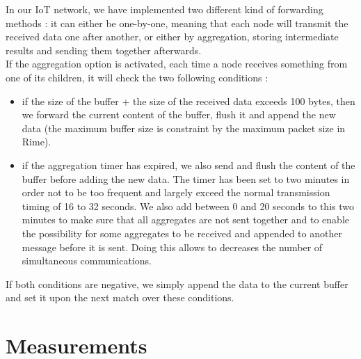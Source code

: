\documentclass{article}
\begin{document}
In our IoT network, we have implemented two different kind of forwarding methods : it can either be one-by-one, meaning that each node will transmit the received data one after another, or either by aggregation, storing intermediate results and sending them together afterwards.\\
If the aggregation option is activated, each time a node receives something from one of its children, it will check the two following conditions :
\begin{itemize}
    \item if the size of the buffer + the size of the received data exceeds 100 bytes, then we forward the current content of the buffer, flush it and append the new data (the maximum buffer size is constraint by the maximum packet size in Rime).
    \item if the aggregation timer has expired, we also send and flush the content of the buffer before adding the new data. The timer has been set to two minutes in order not to be too frequent and largely exceed the normal transmission timing of 16 to 32 seconds. We also add between 0 and 20 seconds to this two minutes to make sure that all aggregates are not sent together and to enable the possibility for some aggregates to be received and appended to another message before it is sent. Doing this allows to decreases the number of simultaneous communications.
\end{itemize}
 If both conditions are negative, we simply append the data to the current buffer and set it upon the next match over these conditions.

\section{Measurements}
\end{document}
